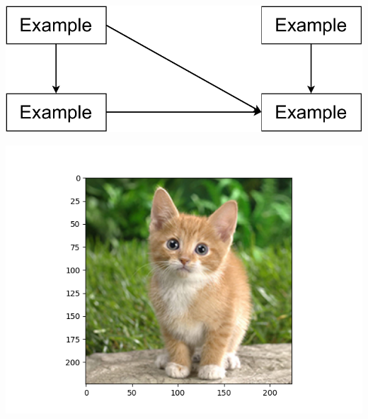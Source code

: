 \documentclass[12pt, a4paper]{article}
\begin{document}
\begin{table}[ht]
    \centering
    \begin{minipage}[t]{.48\linewidth}
        \includegraphics[width=\linewidth]{figures/paper-example.pdf}
        \label{fig:A}
    \end{minipage}
    \qquad
    \begin{minipage}[t]{.44\linewidth}
        \includegraphics[width=\linewidth]{figures/cat.png}
        \label{fig:B}
    \end{minipage}
\end{table}
\end{document}

